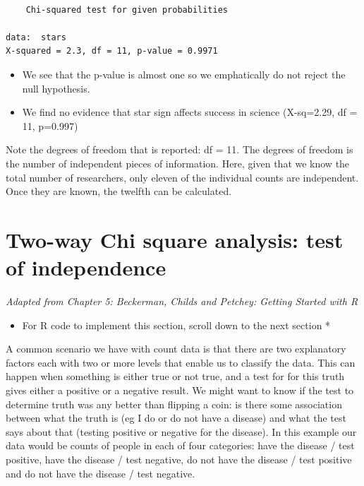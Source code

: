 \documentclass[
  letterpaper,
  DIV=11,
  numbers=noendperiod]{scrreprt}
\providecommand{\tightlist}{%
  \setlength{\itemsep}{0pt}\setlength{\parskip}{0pt}}\usepackage{longtable,booktabs,array}
\begin{document}
\begin{verbatim}

    Chi-squared test for given probabilities

data:  stars
X-squared = 2.3, df = 11, p-value = 0.9971
\end{verbatim}

\begin{itemize}
\tightlist
\item
  We see that the p-value is almost one so we emphatically do not reject
  the null hypothesis.
\item
  We find no evidence that star sign affects success in science
  (X-sq=2.29, df = 11, p=0.997)
\end{itemize}

Note the degrees of freedom that is reported: df = 11. The degrees of
freedom is the number of independent pieces of information. Here, given
that we know the total number of researchers, only eleven of the
individual counts are independent. Once they are known, the twelfth can
be calculated.

\section{Two-way Chi square analysis: test of
independence}\label{two-way-chi-square-analysis-test-of-independence}

\emph{Adapted from Chapter 5: Beckerman, Childs and Petchey: Getting
Started with R}

\begin{itemize}
\tightlist
\item
  For R code to implement this section, scroll down to the next section
  *
\end{itemize}

A common scenario we have with count data is that there are two
explanatory factors each with two or more levels that enable us to
classify the data. This can happen when something is either true or not
true, and a test for for this truth gives either a positive or a
negative result. We might want to know if the test to determine truth
was any better than flipping a coin: is there some association between
what the truth is (eg I do or do not have a disease) and what the test
says about that (testing positive or negative for the disease). In this
example our data would be counts of people in each of four categories:
have the disease / test positive, have the disease / test negative, do
not have the disease / test positive and do not have the disease / test
negative.
\end{document}
